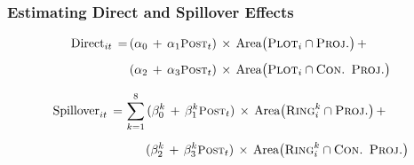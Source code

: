 \documentclass[aspectratio=32]{beamer}
\begin{document}
\begin{frame}
\frametitle{Estimating Direct and Spillover Effects}

\centering

\begin{align*}
\text{Direct}_{it} \,=\, &( \alpha_0 \, +  \, \alpha_1 \textsc{\small Post}_{t}) \, \times \, \text{Area}\big(\textsc{Plot}_i  \cap  \textsc{Proj.}\big) \, + \\[.5em]
&( \alpha_2 \, +  \, \alpha_3 \textsc{\small Post}_{t})  \, \times \, \text{Area}\big(\textsc{Plot}_i \cap \textsc{Con. Proj.}\big)
\end{align*}

\begin{align*}
\text{Spillover}_{it} \,=\, &\sum_{k=1}^{8} \, (\beta_{0}^{k} \,+\, \beta_{1}^{k} \textsc{\small Post}_{t})  \, \times \, \text{Area}\big(\textsc{Ring}_i^{k}  \cap  \textsc{Proj.}\big) \, + \\[.5em]
&\hspace{1.7em}(\beta_{2}^{k} \,+\, \beta_{3}^{k} \textsc{\small Post}_{t})  \, \times \,\text{Area}\big(\textsc{Ring}_i^{k}  \cap \textsc{Con. Proj.}\big)
\end{align*}



\end{frame}
\end{document}
